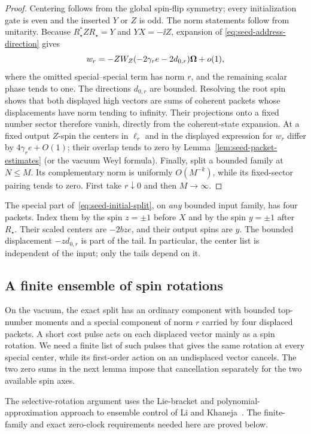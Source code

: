 \begin{proof}
Centering follows from the global spin-flip symmetry; every initialization
gate is even and the inserted \(Y\) or \(Z\) is odd.  The norm statements
follow from unitarity.  Because
\(R_\star^*ZR_\star=Y\) and \(YX=-\ii Z\), expansion of
\eqref{eq:seed-address-direction} gives
\[
 w_r=-Z W_Z(-2\gamma_re-2d_{0,r})\boldsymbol\Omega+o(1),
\]
where the omitted special--special term has norm \(r\), and the remaining
scalar phase tends to one.  The directions \(d_{0,r}\) are bounded.
Resolving the root spin shows that both displayed high vectors are sums
of coherent packets whose displacements have norm tending to infinity.
Their projections onto a fixed number sector therefore vanish, directly
from the coherent-state expansion.  At a fixed output \(Z\)-spin the
centers in \(\ell_r\) and in the displayed expression for \(w_r\) differ
by \(4\gamma_re+O(1)\); their overlap tends to zero by
Lemma~\ref{lem:seed-packet-estimates} (or the vacuum Weyl formula).
Finally, split a bounded family at \(N\leq M\).  Its complementary norm
is uniformly \(O(M^{-k})\), while its fixed-sector pairing tends to zero.
First take \(r\downarrow0\) and then \(M\to\infty\).
\end{proof}

The special part of~\eqref{eq:seed-initial-split}, on \emph{any} bounded
input family, has four packets.  Index them by the spin \(z=\pm1\)
before \(X\) and by the spin \(y=\pm1\) after \(R_\star\).  Their
scaled centers are \(-2bz e\), and their output spins are \(y\).
The bounded displacement \(-z d_{0,r}\) is part of the tail.  In
particular, the center list is independent of the input; only the tails
depend on it.

\subsection{A finite ensemble of spin rotations}

On the vacuum, the exact split has an ordinary component with bounded top-number
moments and a special component of norm \(r\) carried by four displaced
packets.  A short cost pulse acts on each displaced vector mainly as a
spin rotation.  We need a finite list of such pulses that gives the same
rotation at every special center, while its first-order action on an
undisplaced vector cancels.  The two zero sums in the next lemma impose
that cancellation separately for the two available spin axes.

The selective-rotation argument uses the Lie-bracket and polynomial-
approximation approach to ensemble control of Li and
Khaneja~\cite[Section~II, Examples~1--2]{LiKhaneja2005}. The finite-family
and exact zero-clock requirements needed here are proved below.


